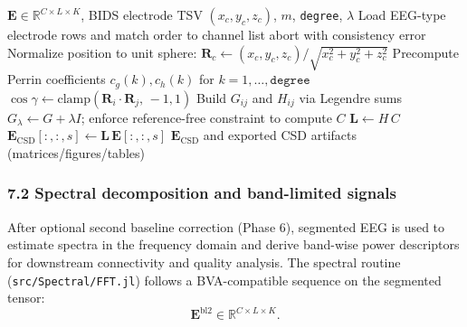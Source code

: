 \begin{algorithm}[H]
\caption{CSD via Perrin spherical spline Laplacian (as in \texttt{CSD.jl})}
\begin{algorithmic}
\Require $\mathbf{E}\in\mathbb{R}^{C\times L\times K}$, BIDS electrode TSV $(x_c,y_c,z_c)$, $m$, \texttt{degree}, $\lambda$
\State Load EEG-type electrode rows and match order to channel list
  \State abort with consistency error
\EndIf
{}
  \State Normalize position to unit sphere: $\mathbf{R}_c\gets (x_c,y_c,z_c)/\sqrt{x_c^2+y_c^2+z_c^2}$
\EndFor
\State Precompute Perrin coefficients $c_g(k), c_h(k)$ for $k=1,\dots,\texttt{degree}$
    \State $\cos\gamma \gets \mathrm{clamp}(\mathbf{R}_i\!\cdot\!\mathbf{R}_j,\,-1,1)$
    \State Build $G_{ij}$ and $H_{ij}$ via Legendre sums
  \EndFor
\EndFor
\State $G_\lambda\gets G+\lambda I$; enforce reference-free constraint to compute $C$
\State $\mathbf{L}\gets H\,C$
  \State $\mathbf{E}_{\mathrm{CSD}}[:,:,s]\gets \mathbf{L}\,\mathbf{E}[:,:,s]$
\EndFor
\Ensure $\mathbf{E}_{\mathrm{CSD}}$ and exported CSD artifacts (matrices/figures/tables)
\end{algorithmic}
\end{algorithm}

\subsubsection*{7.2 Spectral decomposition and band-limited signals}
After optional second baseline correction (Phase 6), segmented EEG is used to estimate spectra in the frequency domain and derive band-wise power descriptors for downstream connectivity and quality analysis. The spectral routine (\texttt{src/Spectral/FFT.jl}) follows a BVA-compatible sequence on the segmented tensor:
\[
\mathbf{E}^{\mathrm{bl2}}\in\mathbb{R}^{C\times L\times K}.
\]


